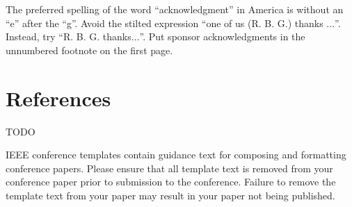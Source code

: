 \documentclass[conference]{IEEEtran}
\begin{document}
The preferred spelling of the word ``acknowledgment'' in America is without 
an ``e'' after the ``g''. Avoid the stilted expression ``one of us (R. B. 
G.) thanks $\ldots$''. Instead, try ``R. B. G. thanks$\ldots$''. Put sponsor 
acknowledgments in the unnumbered footnote on the first page.

\section*{References}

\begin{thebibliography}{00}
 TODO
\end{thebibliography}
\vspace{12pt}
\color{red}
IEEE conference templates contain guidance text for composing and formatting conference papers. Please ensure that all template text is removed from your conference paper prior to submission to the conference. Failure to remove the template text from your paper may result in your paper not being published.
\end{document}
